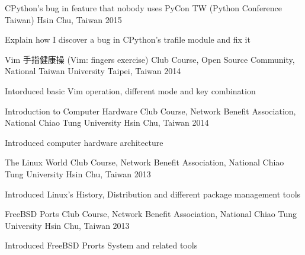 \begin{cventries}
  \talkentry
    {CPython's bug in feature that nobody uses}
    {PyCon TW (Python Conference Taiwan)} %
    {Hsin Chu, Taiwan} %
    {2015} %
    {
      \begin{cvitems} %
        \item {Explain how I discover a bug in CPython's trafile module and fix it}
      \end{cvitems}
    }

  \talkentry
    {Vim 手指健康操 (Vim: fingers exercise)} %
    {Club Course, Open Source Community, National Taiwan University} %
    {Taipei, Taiwan} %
    {2014} %
    {
      \begin{cvitems} %
      \item {Intorduced basic Vim operation, different mode and key combination}
      \end{cvitems}
    }

  \talkentry
    {Introduction to Computer Hardware} %
    {Club Course, Network Benefit Association, National Chiao Tung University} %
    {Hsin Chu, Taiwan} %
    {2014} %
    {
      \begin{cvitems} %
        \item {Introduced computer hardware architecture}
      \end{cvitems}
    }

  \talkentry
    {The Linux World} %
    {Club Course, Network Benefit Association, National Chiao Tung University} %
    {Hsin Chu, Taiwan} %
    {2013} %
    {
      \begin{cvitems} %
        \item {Introduced Linux's History, Distribution and different package management tools}
      \end{cvitems}
    }

  \talkentry
    {FreeBSD Ports} %
    {Club Course, Network Benefit Association, National Chiao Tung University} %
    {Hsin Chu, Taiwan} %
    {2013} %
    {
      \begin{cvitems} %
      \item {Introduced FreeBSD Prorts System and related tools}
      \end{cvitems}
    }

\end{cventries}
